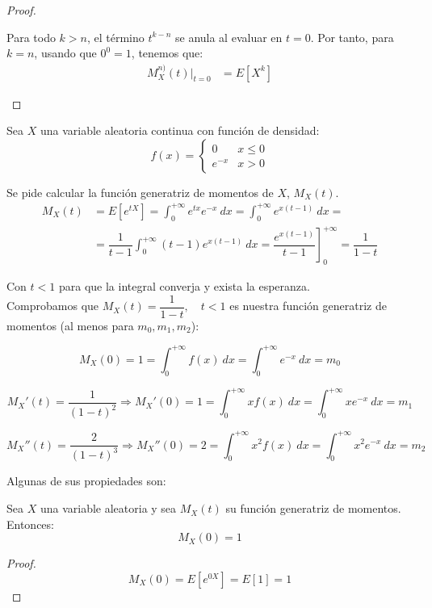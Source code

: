 \begin{proof}
\begin{enumerate}
        Para todo $k>n$, el término $t^{k-n}$ se anula al evaluar en $t=0$. Por tanto, para $k=n$, usando que $0^0=1$, tenemos que:
        \begin{align*}
            M_X^{n)}(t)\Big|_{t=0}
            &= E\left[X^k\right]
        \end{align*}
    \end{enumerate}
\end{proof}

\begin{ejemplo}
    Sea $X$ una variable aleatoria continua con función de densidad:
    $$f(x) = \left\{ \begin{array}{ll}
        0      & x \leq 0 \\
        e^{-x} & x > 0
      \end{array} \right.$$
    
    Se pide calcular la función generatriz de momentos de $X$, $M_X(t)$.
    \begin{equation*}\begin{split}
        M_X(t) &= E[e^{tX}] = \int_0^{+\infty} e^{tx} e^{-x}~dx = \int_0^{+\infty} e^{x(t-1)}~dx =\\
        &=\dfrac{1}{t-1} \int_0^{+\infty} (t-1) e^{x(t-1)}~dx = \left. \dfrac{e^{x(t-1)}}{t-1} \right]_0^{+\infty} = \dfrac{1}{1-t}
    \end{split}\end{equation*}
    
    Con $t<1$ para que la integral converja y exista la esperanza.\\
    
    Comprobamos que $M_X(t) = \dfrac{1}{1-t},\quad t<1$ es nuestra función generatriz de momentos (al menos para $m_0,m_1,m_2$):
    
    $$M_X(0) = 1 = \int_0^{+\infty} f(x)~dx = \int_0^{+\infty} e^{-x}~dx = m_0$$
    
    $$M_X'(t) = \dfrac{1}{(1-t)^2}\Longrightarrow M_X'(0) = 1 = \int_0^{+\infty} xf(x)~dx = \int_0^{+\infty} xe^{-x}~dx = m_1$$
    
    $$M_X''(t) = \dfrac{2}{(1-t)^3} \Longrightarrow M_X''(0) = 2 = \int_0^{+\infty} x^2f(x)~dx = \int_0^{+\infty} x^2e^{-x}~dx = m_2$$
\end{ejemplo}

Algunas de sus propiedades son:
\begin{lema}
    Sea $X$ una variable aleatoria y sea $M_X(t)$ su función generatriz de momentos. Entonces:
    $$M_X(0)=1$$
\end{lema}
\begin{proof}
    $$M_X(0) = E[e^{0X}] = E[1] = 1$$
\end{proof}

